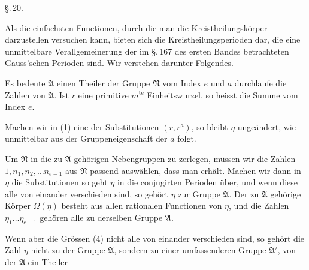 
\begin{center}
\S.\,20.

\end{center}

Als die einfachsten Functionen, durch die man die Kreistheilungskörper darzustellen versuchen kann, bieten sich die Kreistheilungsperioden dar, die eine unmittelbare Verallgemeinerung der im \S.\,167 des ersten Bandes betrachteten Gauss'schen Perioden sind. Wir verstehen darunter Folgendes.

Es bedeute $\mathfrak{A}$ einen Theiler der Gruppe $\mathfrak{N}$ vom Index $e$ und $a$ durchlaufe die Zahlen von $\mathfrak{A}$. Ist $r$ eine primitive $m^{\text{te}}$ Einheitswurzel, so heisst die Summe
 vom Index $e$.

Machen wir in (1) eine der Substitutionen $(r, r^a)$, so bleibt $\eta$ ungeändert, wie unmittelbar aus der Gruppeneigenschaft der $a$ folgt.

Um $\mathfrak{N}$ in die zu $\mathfrak{A}$ gehörigen Nebengruppen zu zerlegen, müssen wir die Zahlen $1, n_1, n_2, \ldots n_{e-1}$ aus $\mathfrak{N}$ passend auswählen, dass man
erhält. Machen wir dann in $\eta$ die Substitutionen
so geht $\eta$ in die conjugirten Perioden
über, und wenn diese alle von einander verschieden sind, so gehört $\eta$ zur Gruppe $\mathfrak{A}$. Der zu $\mathfrak{A}$ gehörige Körper $\Omega(\eta)$ besteht aus allen rationalen Functionen von $\eta$, und die Zahlen $\eta_1 \ldots \eta_{e-1}$ gehören alle zu derselben Gruppe $\mathfrak{A}$.

Wenn aber die Grössen (4) nicht alle von einander verschieden sind, so gehört die Zahl $\eta$ nicht zu der Gruppe $\mathfrak{A}$, sondern zu einer umfassenderen Gruppe $\mathfrak{A}'$, von der $\mathfrak{A}$ ein Theiler
